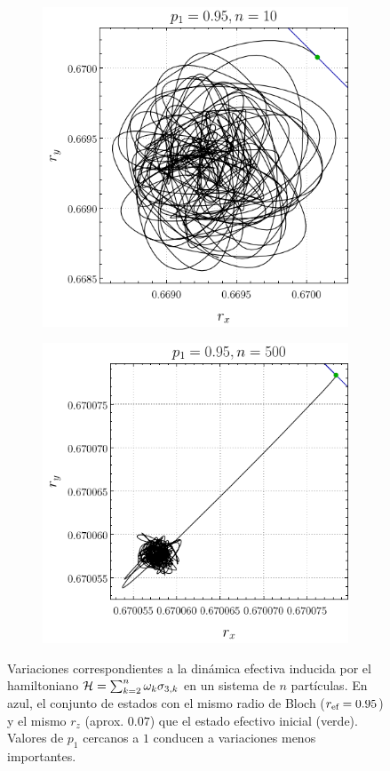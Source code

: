 \begin{figure}[ht!]
    \centering
    \begin{subfigure}{0.5\textwidth}
      \centering
      \includegraphics[width=0.9\linewidth]{chapter3/figures_separable/local_prefinv_ran_n=10_p=0.95_r=0.95_a=-3_b=3.png}
    \end{subfigure}%
    \begin{subfigure}{0.5\textwidth}
      \centering
      \includegraphics[width=0.9\linewidth]{chapter3/figures_separable/local_prefinv_ran_n=500_p=0.95_r=0.95_a=-3_b=3.png}
    \end{subfigure}
    \caption{Variaciones correspondientes a la dinámica efectiva inducida por el hamiltoniano $\mathcal{H}=\sum_{k=2}^{n}\omega_{k}\sigma_{3,k}$ en un sistema de $n$ partículas. En azul, el conjunto de estados con el mismo radio de Bloch ($r_{\text{ef}}=0.95$) y el mismo $r_{z}$ (aprox. $0.07$) que el estado efectivo inicial (verde). Valores de $p_{1}$ cercanos a $1$ conducen a variaciones menos importantes. \label{fig:PrefInv1}}
\end{figure}

